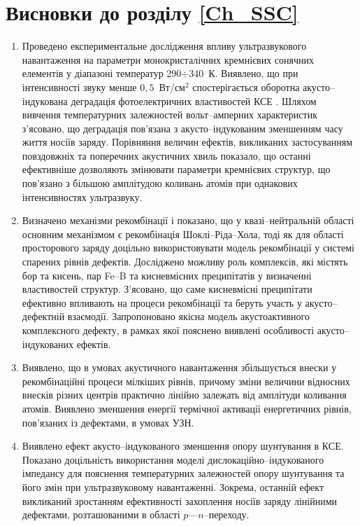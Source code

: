 \section*{Висновки до розділу \ref{Ch_SSC}}
  \begin{enumerate}[leftmargin=0cm,itemindent=3em]
     \item Проведено експериментальне дослідження впливу ультразвукового навантаження на параметри монокристалічних кремнієвих сонячних елементів
     у діапазоні температур 290$\div$340~К.
     Виявлено, що при інтенсивності звуку менше $0,5$~Вт/см$^2$ спостерігається оборотна акусто--індукована деградація фотоелектричних властивостей КСЕ .
     Шляхом вивчення температурних залежностей вольт--амперних характеристик з'ясовано, що  деградація  пов'язана з акусто--індукованим зменшенням часу життя носіїв заряду.
     Порівняння величин ефектів, викликаних застосуванням повздовжніх та поперечних акустичних хвиль  показало, що останні ефективніше дозволяють змінювати параметри кремнієвих структур, що пов'язано з більшою амплітудою коливань атомів при однакових інтенсивностях ультразвуку.


     \item Визначено механізми рекомбінації і показано, що у квазі--нейтральній області основним механізмом є рекомбінація Шоклі--Ріда--Хола,
     тоді як для області просторового заряду доцільно використовувати модель рекомбінації у системі спарених рівнів дефектів.
     Досліджено можливу роль комплексів, які містять бор та кисень, пар Fe--B та кисневмісних преципітатів у визначенні властивостей структур.
З'ясовано, що саме кисневмісні преципітати ефективно впливають на процеси рекомбінації та беруть участь у акусто--дефектній взаємодії.
Запропоновано якісна модель акустоактивного комплексного дефекту, в рамках якої пояснено виявлені особливості акусто--індукованих ефектів.


     \item Виявлено, що в умовах акустичного навантаження збільшується внески у рекомбінаційні процеси мілкіших рівнів, причому зміни величини відносних внесків різних центрів  практично лінійно залежать від амплітуди коливання атомів.
         Виявлено зменшення енергії термічної активації енергетичних рівнів, пов'язаних із дефектами, в умовах УЗН.

     \item Виявлено ефект акусто--індукованого зменшення  опору шунтування в КСЕ.
      Показано доцільність використання моделі дислокаційно--індукованого імпедансу для пояснення температурних залежностей  опору шунтування та його змін при ультразвуковому навантаженні.
      Зокрема, останній ефект викликаний зростанням ефективності захоплення носіїв заряду лінійними дефектами,
      розташованими в області $p$---$n$--переходу.




\end{enumerate}
